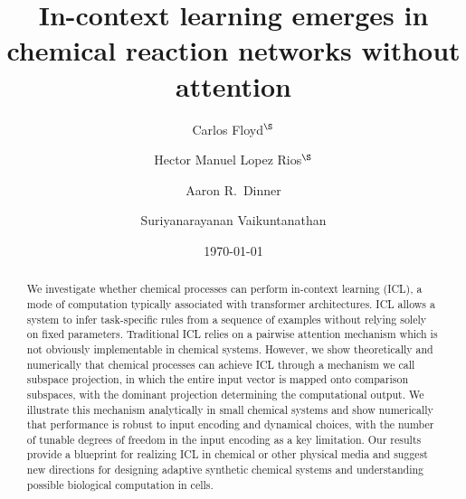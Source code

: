 \documentclass[%
reprint,
superscriptaddress,
amsmath,amssymb,
aps,
]{revtex4-2}
\begin{document}
	
	\title{In-context learning emerges in chemical reaction networks without attention}
	
	\author{Carlos Floyd$^\S$}
	
	\author{Hector Manuel Lopez Rios$^\S$}
	
	
	\author{Aaron R.\ Dinner}
	
	\author{Suriyanarayanan Vaikuntanathan}
	
	
	\date{\today}
	\begin{abstract}
		We investigate whether chemical processes can perform in-context learning (ICL), a mode of computation typically associated with transformer architectures. ICL allows a system to infer task-specific rules from a sequence of examples without relying solely on fixed parameters. Traditional ICL relies on a pairwise attention mechanism which is not obviously implementable in chemical systems. However, we show theoretically and numerically that chemical processes can achieve ICL through a mechanism we call subspace projection, in which the entire input vector is mapped onto comparison subspaces, with the dominant projection determining the computational output. We illustrate this mechanism analytically in small chemical systems and show numerically that performance is robust to input encoding and dynamical choices, with the number of tunable degrees of freedom in the input encoding as a key limitation. Our results provide a blueprint for realizing ICL in chemical or other physical media and suggest new directions for designing adaptive synthetic chemical systems and understanding possible biological computation in cells.
		
	\end{abstract}
	
\end{document}
